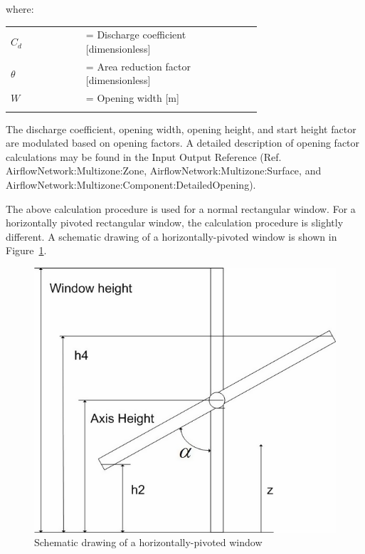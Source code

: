 where:

\begin{tabular}{lp{0.7\linewidth}}
\\
$C_d$ &= Discharge coefficient [dimensionless]\\
$\theta$ &= Area reduction factor [dimensionless]\\
$W$ &= Opening width [m]\\
\\
\end{tabular}

The discharge coefficient, opening width, opening height, and start height factor are modulated based on opening factors. A detailed description of opening factor calculations may be found in the Input Output Reference (Ref. AirflowNetwork:Multizone:Zone, AirflowNetwork:Multizone:Surface, and AirflowNetwork:Multizone:Component:DetailedOpening).

The above calculation procedure is used for a normal rectangular window. For a horizontally pivoted rectangular window, the calculation procedure is slightly different. A schematic drawing of a horizontally-pivoted window is shown in Figure~\ref{fig:schematic-drawing-of-a-horizontally-pivoted}.

\begin{figure}[hbtp] %
\centering
\includegraphics[width=0.9\linewidth, height=0.9\textheight, keepaspectratio=true]{media/image2703.png}
\caption{Schematic drawing of a horizontally-pivoted window \protect \label{fig:schematic-drawing-of-a-horizontally-pivoted}}
\end{figure}

